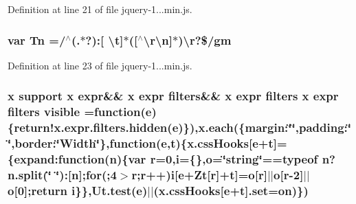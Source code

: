Definition at line 21 of file jquery-\/1...\+min.\+js.

\subsubsection[{\texorpdfstring{Tn}{Tn}}]{\setlength{\rightskip}{0pt plus 5cm}var Tn =/$^\wedge$(.$\ast$?)\+:\mbox{[} \textbackslash{}{\bf t}\mbox{]}$\ast$(\mbox{[}$^\wedge$\textbackslash{}{\bf r\textbackslash{}n}\mbox{]}$\ast$)\textbackslash{}{\bf r}?\$/gm}\hypertarget{obj_2_release_2_package_2_package_tmp_2_scripts_2jquery-1_810_82_8min_8js_a2a743fa90b7bc233019c5b720ccde5cc}{}\label{obj_2_release_2_package_2_package_tmp_2_scripts_2jquery-1_810_82_8min_8js_a2a743fa90b7bc233019c5b720ccde5cc}


Definition at line 23 of file jquery-\/1...\+min.\+js.

\subsubsection[{\texorpdfstring{visible}{visible}}]{ {\bf x} support {\bf x} expr\&\& {\bf x} expr filters\&\& {\bf x} expr filters {\bf x} expr filters visible =function({\bf e})\{{\bf return!x.\+expr.\+filters.\+hidden}({\bf e})\}),{\bf x.\+each}(\{margin\+:\char`\"{}\char`\"{},padding\+:\char`\"{}\char`\"{},border\+:\char`\"{}Width\char`\"{}\},function({\bf e},{\bf t})\{x.\+css\+Hooks\mbox{[}{\bf e}+{\bf t}\mbox{]}=\{expand\+:function({\bf n})\{var {\bf r}=0,{\bf i}=\{\},{\bf o}=\char`\"{}string\char`\"{}==typeof {\bf n}?n.\+split(\char`\"{} \char`\"{})\+:\mbox{[}{\bf n}\mbox{]};for(;4$>${\bf r};{\bf r}++){\bf i}\mbox{[}{\bf e}+Zt\mbox{[}{\bf r}\mbox{]}+{\bf t}\mbox{]}={\bf o}\mbox{[}{\bf r}\mbox{]}$\vert$$\vert${\bf o}\mbox{[}{\bf r}-\/2\mbox{]}$\vert$$\vert${\bf o}\mbox{[}0\mbox{]};return {\bf i}\}\},Ut.\+test({\bf e})$\vert$$\vert$(x.\+css\+Hooks\mbox{[}{\bf e}+{\bf t}\mbox{]}.set={\bf on})\})}\hypertarget{obj_2_release_2_package_2_package_tmp_2_scripts_2jquery-1_810_82_8min_8js_a52992524aa1f4d01d5c9f1b9a15c35f5}{}\label{obj_2_release_2_package_2_package_tmp_2_scripts_2jquery-1_810_82_8min_8js_a52992524aa1f4d01d5c9f1b9a15c35f5}


